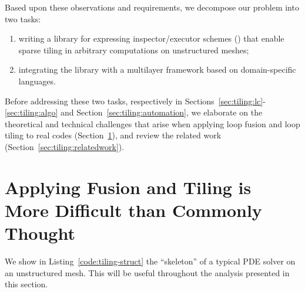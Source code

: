 Based upon these observations and requirements, we decompose our problem into two tasks:
\begin{enumerate}
\item writing a library for expressing inspector/executor schemes (\cite{ST-Saltz91}) that enable sparse tiling in arbitrary computations on unstructured meshes;
\item integrating the library with a multilayer framework based on domain-specific languages.
\end{enumerate}
Before addressing these two tasks, respectively in Sections~\ref{sec:tiling:lc}-\ref{sec:tiling:algo} and Section~\ref{sec:tiling:automation}, we elaborate on the theoretical and technical challenges that arise when applying loop fusion and loop tiling to real codes (Section~\ref{sec:tiling:difficult}), and review the related work (Section~\ref{sec:tiling:relatedwork}).  



\section{Applying Fusion and Tiling is More Difficult than Commonly Thought}
\label{sec:tiling:difficult}
We show in Listing~\ref{code:tiling-struct} the ``skeleton'' of a typical PDE solver on an unstructured mesh. This will be useful throughout the analysis presented in this section.

